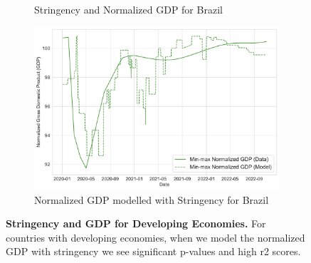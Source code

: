 \documentclass[tikz,fleqn,12pt]{wlscirep}
\begin{document}
\begin{figure}[htbp!]
\begin{subfigure}[t]{0.48\textwidth}
    \caption{Stringency and Normalized GDP for Brazil}
    \label{fig:stringency_vs_gdp_BRA}
  \end{subfigure}
  \hfill
  \begin{subfigure}[t]{0.48\textwidth}
    \centering
    \includegraphics[width=\linewidth]{images/gdp_modelled_with_stringency_BRA.pdf}
    \caption{Normalized GDP modelled with Stringency for Brazil}
    \label{fig:gdp_modelled_with_stringency_BRA}
  \end{subfigure}
  \caption{\textbf{Stringency and GDP for Developing Economies.} For countries with developing economies, when we model the normalized GDP with stringency we see significant p-values and high r2 scores.}
  \label{fig:stringency_gdp_developing}
\end{figure}
\end{document}
